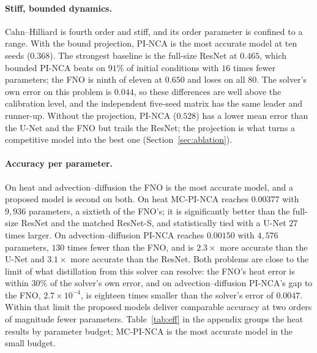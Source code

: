 \documentclass{article}
\begin{document}


\paragraph{Stiff, bounded dynamics.} Cahn--Hilliard is fourth order and stiff, and its
order parameter is confined to a range. With the bound projection, PI-NCA is the most
accurate model at ten seeds ($0.368$). The strongest baseline is the full-size ResNet at
$0.465$, which bounded PI-NCA beats on $91\%$ of initial conditions with $16$ times fewer
parameters; the FNO is ninth of eleven at $0.650$ and loses on all 80. The solver's own
error on this problem is $0.044$, so these differences are well above the calibration
level, and the independent five-seed matrix has the same leader and runner-up. Without
the projection, PI-NCA ($0.528$) has a lower mean error than the U-Net and the FNO but
trails the ResNet; the projection is what turns a competitive model into the best one
(Section~\ref{sec:ablation}).

\paragraph{Accuracy per parameter.} On heat and advection--diffusion the FNO is the most
accurate model, and a proposed model is second on both. On heat MC-PI-NCA reaches $0.00377$
with $9{,}936$ parameters, a sixtieth of the FNO's; it is significantly better than the
full-size ResNet and the matched ResNet-S, and statistically tied with a U-Net $27$ times
larger. On advection--diffusion PI-NCA reaches $0.00150$ with $4{,}576$ parameters, $130$
times fewer than the FNO, and is $2.3\times$ more accurate than the U-Net and $3.1\times$
more accurate than the ResNet. Both problems are close to the limit of what distillation
from this solver can resolve: the FNO's heat error is within $30\%$ of the solver's own
error, and on advection--diffusion PI-NCA's gap to the FNO, $2.7\times10^{-4}$, is eighteen
times smaller than the solver's error of $0.0047$. Within that limit the proposed models
deliver comparable accuracy at two orders of magnitude fewer parameters.
Table~\ref{tab:eff} in the appendix groups the heat results by parameter budget; MC-PI-NCA
is the most accurate model in the small budget.
\end{document}
